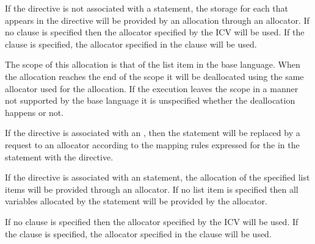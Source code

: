 \descr

If the directive is not associated with a statement, the storage for each  that appears in the directive will be provided by an allocation through an allocator. If no clause is specified then the allocator specified by the  ICV will be used. If the  clause is specified, the allocator specified in the clause will be used.

The scope of this allocation is that of the list item in the base language. When the allocation reaches the end of the scope it will be deallocated using the same allocator used for the allocation. If the execution leaves the scope in a manner not supported by the base language it is unspecified whether the deallocation happens or not.

\begin{ccppspecific}
If the directive is associated with an , then the statement will be replaced by a request to an allocator according to the mapping rules expressed for the  in the statement with the  directive. 
\end{ccppspecific}

\begin{fortranspecific}
If the directive is associated with an  statement, the allocation of the specified list items will be provided through an allocator. If no list item is specified then all variables allocated by the  statement will be provided by the allocator.
\end{fortranspecific}

If no clause is specified then the allocator specified by the  ICV will be used. If the  clause is specified, the allocator specified in the clause will be used.


